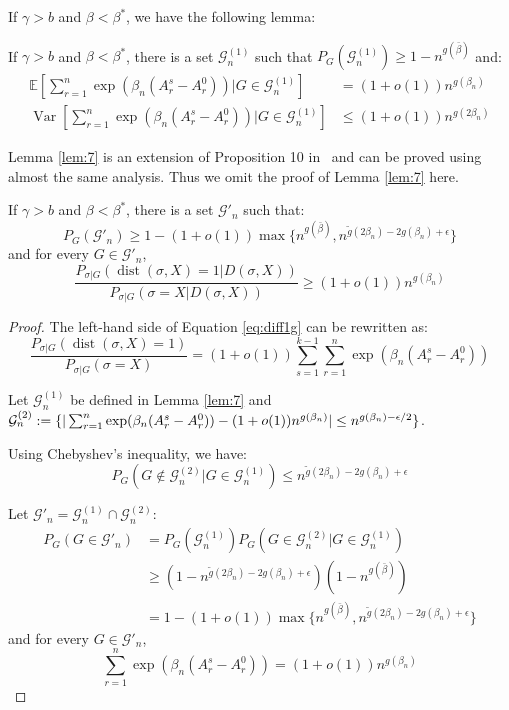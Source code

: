 \documentclass[entropy,article,accept,moreauthors,pdftex]{Definitions/mdpi}
\newcommand{\cG}{\mathcal{G}}
\newcommand{\1}{\mathbbm{1}}
\DeclareMathOperator{\Var}{Var}
\DeclareMathOperator{\Dist}{dist}
\begin{document}
\begin{paracol}{2}
If $\gamma > b$ and $\beta < \beta^*$, we have the following lemma:
\begin{Lemma}\label{lem:7}
	If $\gamma > b$ and $\beta < \beta^*$, there is a set $\cG^{(1)}_n$ such that
	$P_G(\cG^{(1)}_n) \geq 1-n^{g(\bar{\beta})}$
	and:
\begin{align}
	\mathbb{E}[\sum_{r=1}^n \exp(\beta_n (A_r^s - A_r^0)) | G \in \cG^{(1)}_n] &= (1+o(1))n^{g(\beta_n)} \\
	\Var[\sum_{r=1}^n \exp(\beta_n (A_r^s - A_r^0)) | G \in \cG^{(1)}_n] &\leq (1+o(1)) n^{g(2\beta_n)} 
	\end{align}
\end{Lemma}
Lemma \ref{lem:7} is an extension of Proposition 10 in~\cite{ye2020exact} and can be proved using almost the same analysis. Thus we omit the
proof of Lemma \ref{lem:7} here.
\begin{Lemma}\label{prop:large2}
	If $\gamma > b$ and $\beta < \beta^*$, there is a set $\cG'_n$ such that:
\begin{equation}
	P_G(\cG'_n) \geq 1 - (1+o(1))\max\{n^{g(\bar{\beta})}, n^{\tilde{g}(2\beta_n) - 2g(\beta_n) + \epsilon} \}
	\end{equation}
	and for every $G \in \cG'_n$,
\begin{equation}\label{eq:diff1g}
	\frac{P_{\sigma|G}(\Dist(\sigma, X)=1 | D(\sigma, X))}
	{P_{\sigma|G}(\sigma=X | D(\sigma, X))} \geq (1+o(1))n^{g(\beta_n)}
	\end{equation}
	
\end{Lemma}
\begin{proof}
The left-hand side of Equation \eqref{eq:diff1g} can be rewritten as:
\begin{equation}\label{eq:knd}
	\frac{P_{\sigma|G}(\Dist(\sigma, X)=1)}
{P_{\sigma|G}(\sigma=X)}= (1+o(1))\sum_{s=1}^{k-1}\sum_{r=1}^n \exp(\beta_n (A_r^s - A_r^0))
\end{equation}

Let $\cG^{(1)}_n$ be defined in Lemma \ref{lem:7}
and $\cG^{(2)}_n: = \{|\sum_{r=1}^n \exp(\beta_n (A_r^s - A_r^0)) -\linebreak (1+o(1))n^{g(\beta_n)}  | \leq n^{g(\beta_n) - \epsilon / 2} \}$.

Using Chebyshev's inequality, we have:
\begin{equation*}
P_G(G \not\in \cG^{(2)}_n \Big\vert  G \in \cG^{(1)}_n) \leq n^{\tilde{g}(2\beta_n) - 2g(\beta_n) + \epsilon}
\end{equation*}

Let $\cG'_n = \cG^{(1)}_n \cap \cG^{(2)}_n$:
\begin{align*}
P_G(G \in \cG'_n) &= P_G(\cG^{(1)}_n) P_G(G \in \cG_n^{(2)} | G \in \cG_n^{(1)}) \\
& \geq (1-n^{\tilde{g}(2\beta_n) - 2g(\beta_n) + \epsilon})(1-n^{g(\bar{\beta})}) \\
&= 1-(1+o(1))\max\{n^{g(\bar{\beta})}, n^{\tilde{g}(2\beta_n) - 2g(\beta_n) + \epsilon} \}
\end{align*}
and for every $G\in\cG'_n$,
\begin{equation*}
\sum_{r=1}^n \exp(\beta_n (A_r^s - A_r^0)) = (1+o(1)) n^{g(\beta_n)}
\end{equation*}


\end{proof}
\end{paracol}
\end{document}
